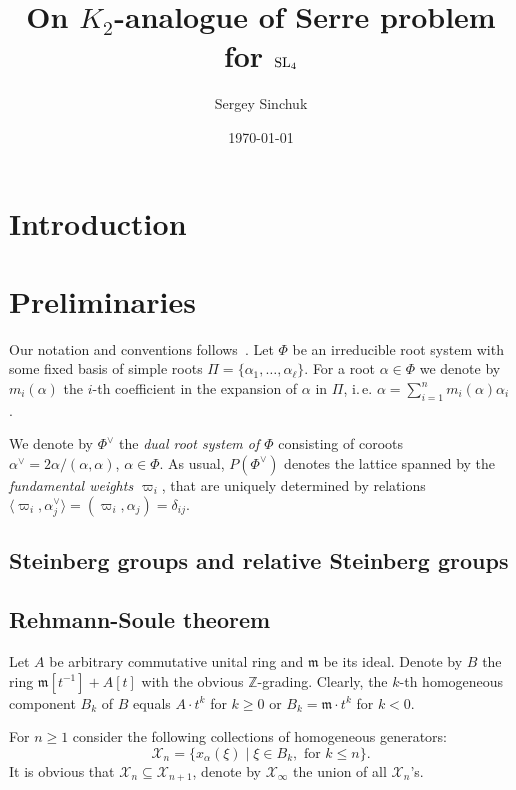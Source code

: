 \documentclass[oneside, 10pt]{amsart}
\title{On $K_2$-analogue of Serre problem for $\operatorname{SL}_4$}
\author {Sergey Sinchuk}
\date {\today}
\newcommand{\XX}[1]{\mathcal{X}_{#1}}
\numberwithin{equation}{section}
\numberwithin{lemma}{section}
\theoremstyle{definition}
\theoremstyle{remark}
\begin{document}
   
\maketitle

\section{Introduction}

\section{Preliminaries}

Our notation and conventions follows~\cite[\S~4]{Vav09}.
Let $\Phi$ be an irreducible root system with some fixed basis of simple roots $\Pi = \{\alpha_1, \ldots, \alpha_\ell\}$.
For a root $\alpha\in\Phi$ we denote by $m_i(\alpha)$ the $i$-th coefficient in the expansion of $\alpha$ in $\Pi$,
 i.\,e. $\alpha = \sum_{i=1}^n m_i(\alpha) \alpha_i$.

We denote by $\Phi^\vee$ the \emph{dual root system of $\Phi$} consisting of coroots $\alpha^\vee = 2\alpha/(\alpha, \alpha)$, $\alpha\in \Phi$.
As usual, $P(\Phi^\vee)$ denotes the lattice spanned by the \emph{fundamental weights $\varpi_i$},
 that are uniquely determined by relations $\langle\varpi_i, \alpha_j^\vee \rangle = (\varpi_i, \alpha_j) = \delta_{ij}.$ %

\subsection{Steinberg groups and relative Steinberg groups}

\subsection{Rehmann-Soule theorem}

Let $A$ be arbitrary commutative unital ring and $\mathfrak{m}$ be its ideal.
Denote by $B$ the ring $\mathfrak{m}[t^{-1}] + A[t]$ with the obvious $\mathbb{Z}$-grading.
Clearly, the $k$-th homogeneous component $B_k$ of $B$ equals $A\cdot t^k$ for $k \geq 0$ or $B_k = \mathfrak{m} \cdot t^k$ for $k<0$.

For $n \geq 1$ consider the following collections of homogeneous generators:
\[\XX{n} = \{ x_\alpha(\xi) \mid \xi \in B_k,\text{ for } k\leq n\}. \]
It is obvious that $\XX{n} \subseteq \XX{n+1}$, denote by $\XX{\infty}$ the union of all $\XX{n}$'s.
\end{document}
